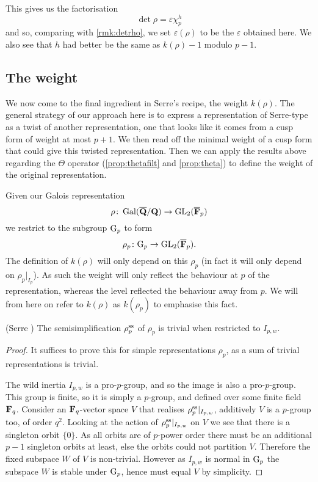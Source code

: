 \documentclass[a4paper,12pt]{article}
\begin{document}
This gives us the factorisation
\[
\det\rho = \varepsilon \chi_p^h
\]
and so, comparing with \cref{rmk:detrho}, we set $\varepsilon(\rho)$ to be the $\varepsilon$ obtained here.
We also see that $h$ had better be the same as $k(\rho)-1$ modulo $p-1$.



\subsection{The weight}
We now come to the final ingredient in Serre's recipe, the weight $k(\rho)$.
The general strategy of our approach here is to express a representation of Serre-type as a twist of another representation, one that looks like it comes from a cusp form of weight at most $p+1$.
We then read off the minimal weight of a cusp form that could give this twisted representation.
Then we can apply the results above regarding the $\Theta$ operator (\cref{prop:thetafilt} and \cref{prop:theta}) to define the weight of the original representation.

Given our Galois representation
\[
\rho \colon \operatorname{Gal}(\overline{\mathbf{Q}}/\mathbf{Q}) \to \operatorname{GL}_2(\overline{\mathbf{F}}_p)
\]
we restrict to the subgroup $\mathrm{G}_p$ to form
\[
\rho_p\colon \mathrm{G}_p \to \operatorname{GL}_2(\overline{\mathbf{F}}_p).
\]
The definition of $k(\rho)$ will only depend on this $\rho_p$ (in fact it will only depend on $\rho_p|_{I_p}$).
As such the weight will only reflect the behaviour at $p$ of the representation, whereas the level reflected the behaviour away from $p$.
We will from here on refer to $k(\rho)$ as $k(\rho_p)$ to emphasise this fact.

\begin{prop}(Serre \cite[prop. 4]{Serre72})\label{prop:wildtriv}
The semisimplification $\rho^\text{ss}_p$ of $\rho_p$ is trivial when restricted to $I_{p,w}$.
\end{prop}
\begin{proof}
It suffices to prove this for simple representations $\rho_p$, as a sum of trivial representations is trivial.

The wild inertia $I_{p,w}$ is a pro-$p$-group, and so the image is also a pro-$p$-group.
This group is finite, so it is simply a $p$-group, and defined over some finite field $\mathbf{F}_q$.
Consider an $\mathbf{F}_q$-vector space $V$ that realises $\rho^\text{ss}_p|_{I_{p,w}}$,  additively $V$ is a $p$-group too, of order $q^2$.
Looking at the action of $\rho^\text{ss}_p|_{I_{p,w}}$ on $V$ we see that there is a singleton orbit $\{0\}$.
As all orbits are of $p$-power order there must be an additional $p-1$ singleton orbits at least, else the orbits could not partition $V$.
Therefore the fixed subspace $W$ of $V$ is non-trivial.
However as $I_{p,w}$ is normal in $\mathrm{G}_p$ the subspace $W$ is stable under $\mathrm{G}_p$, hence must equal $V$ by simplicity.
\end{proof}
\end{document}
